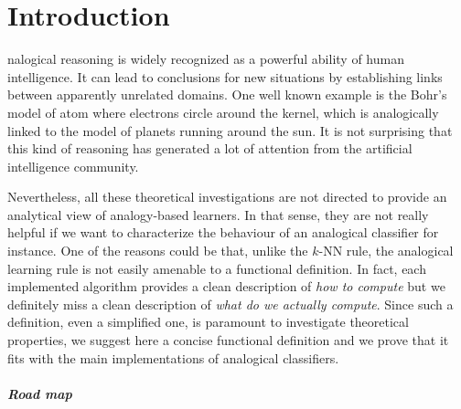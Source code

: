 \chapter*{Introduction}
nalogical reasoning is widely recognized as a powerful ability of human
intelligence.  It can lead to conclusions for new situations by establishing
links between apparently unrelated domains. One well known example is the
Bohr's model of atom where electrons circle around the kernel, which is
analogically linked to the model of planets running around the sun. It is not
surprising that this kind of reasoning has generated a lot of attention from
the artificial intelligence community.


Nevertheless, all these theoretical investigations are not directed to provide
an analytical view of analogy-based learners. In that sense, they are not
really helpful if we want to characterize the behaviour of an analogical
classifier for instance. One of the reasons could be that, unlike the $k$-NN
rule, the analogical learning rule is not easily amenable to a functional
definition. In fact, each implemented algorithm  provides a clean description
of {\it how to compute} but we definitely miss a clean description of {\it what
do we actually compute}.
Since such a definition, even a simplified one, is paramount to investigate
theoretical properties, we suggest here a concise functional definition and we
prove that it fits with the main implementations of analogical classifiers.

\paragraph{Road map\\}


